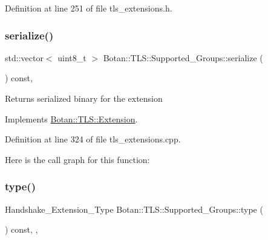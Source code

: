 Definition at line 251 of file tls\+\_\+extensions.\+h.

\mbox{\label{class_botan_1_1_t_l_s_1_1_supported___groups_a013f5094de8ead5c72eb9f9f4adb9481}} 
\subsubsection{\texorpdfstring{serialize()}{serialize()}}
{\footnotesize\ttfamily std\+::vector$<$ uint8\+\_\+t $>$ Botan\+::\+T\+L\+S\+::\+Supported\+\_\+\+Groups\+::serialize (\begin{DoxyParamCaption}{ }\end{DoxyParamCaption}) const\hspace{0.3cm}{\ttfamily [override]}, {\ttfamily [virtual]}}

\begin{DoxyReturn}{Returns}
serialized binary for the extension 
\end{DoxyReturn}


Implements \mbox{\hyperlink{class_botan_1_1_t_l_s_1_1_extension_a56788726ad2526db54e5a26039cb69db}{Botan\+::\+T\+L\+S\+::\+Extension}}.



Definition at line 324 of file tls\+\_\+extensions.\+cpp.

Here is the call graph for this function\+:
\mbox{\label{class_botan_1_1_t_l_s_1_1_supported___groups_ab3126c91ffe1b598019892ed08117a67}} 
\subsubsection{\texorpdfstring{type()}{type()}}
{\footnotesize\ttfamily Handshake\+\_\+\+Extension\+\_\+\+Type Botan\+::\+T\+L\+S\+::\+Supported\+\_\+\+Groups\+::type (\begin{DoxyParamCaption}{ }\end{DoxyParamCaption}) const\hspace{0.3cm}{\ttfamily [inline]}, {\ttfamily [override]}, {\ttfamily [virtual]}}

